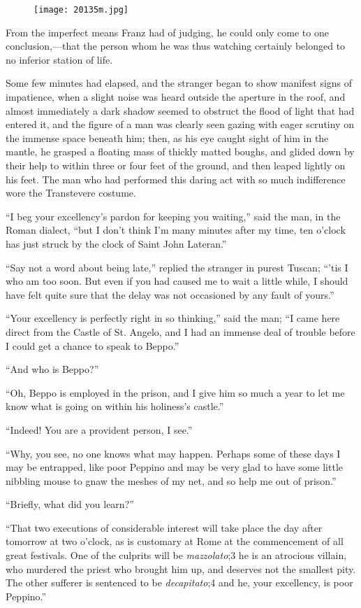 \begin{figure}[ht]
\texttt{[image: 20135m.jpg]}
\end{figure}

From the imperfect means Franz had of judging, he could only come to
one conclusion,—that the person whom he was thus watching certainly
belonged to no inferior station of life.

Some few minutes had elapsed, and the stranger began to show manifest
signs of impatience, when a slight noise was heard outside the aperture
in the roof, and almost immediately a dark shadow seemed to obstruct
the flood of light that had entered it, and the figure of a man was
clearly seen gazing with eager scrutiny on the immense space beneath
him; then, as his eye caught sight of him in the mantle, he grasped a
floating mass of thickly matted boughs, and glided down by their help
to within three or four feet of the ground, and then leaped lightly on
his feet. The man who had performed this daring act with so much
indifference wore the Transtevere costume.

“I beg your excellency’s pardon for keeping you waiting,” said the man,
in the Roman dialect, “but I don’t think I’m many minutes after my
time, ten o’clock has just struck by the clock of Saint John Lateran.”

“Say not a word about being late,” replied the stranger in purest
Tuscan; “’tis I who am too soon. But even if you had caused me to wait
a little while, I should have felt quite sure that the delay was not
occasioned by any fault of yours.”

“Your excellency is perfectly right in so thinking,” said the man; “I
came here direct from the Castle of St. Angelo, and I had an immense
deal of trouble before I could get a chance to speak to Beppo.”

“And who is Beppo?”

“Oh, Beppo is employed in the prison, and I give him so much a year to
let me know what is going on within his holiness’s castle.”

“Indeed! You are a provident person, I see.”

“Why, you see, no one knows what may happen. Perhaps some of these days
I may be entrapped, like poor Peppino and may be very glad to have some
little nibbling mouse to gnaw the meshes of my net, and so help me out
of prison.”

“Briefly, what did you learn?”

“That two executions of considerable interest will take place the day
after tomorrow at two o’clock, as is customary at Rome at the
commencement of all great festivals. One of the culprits will be
\textit{mazzolato};3 he is an atrocious villain, who murdered the priest who
brought him up, and deserves not the smallest pity. The other sufferer
is sentenced to be \textit{decapitato};4 and he, your excellency, is poor
Peppino.”

